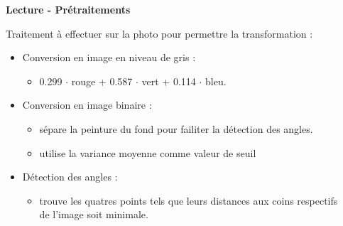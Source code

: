 \documentclass{beamer}
\begin{document}
\begin{frame}[t]
\begin{columns}[t]
\begin{column}{.49\linewidth}
                \begin{block}{\centering \textbf{Lecture - Prétraitements}}
                    \vspace{.5cm}

                    Traitement à effectuer sur la photo pour permettre la transformation :
                    \begin{itemize}[label=\textbullet]
                        \item Conversion en image en niveau de gris :
                        \begin{itemize}[label=$\rightarrow$]
                            \item 0.299 $\cdot$ rouge + 0.587 $\cdot$ vert + 0.114 $\cdot$ bleu.
                        \end{itemize}
                        \item Conversion en image binaire :
                        \begin{itemize}[label=$\rightarrow$]
                            \item sépare la peinture du fond pour failiter la détection des angles.
                            \item utilise la variance moyenne comme valeur de seuil
                        \end{itemize}
                        \item Détection des angles :
                        \begin{itemize}[label=$\rightarrow$]
                            \item trouve les quatres points tels que leurs distances aux coins respectifs de l'image soit minimale.
                        \end{itemize}
                    \end{itemize}

                    \vspace{.5cm}
                \end{block}
            \end{column}


            \begin{column}{.49\linewidth}


\end{column}
\end{columns}
\end{frame}
\end{document}
